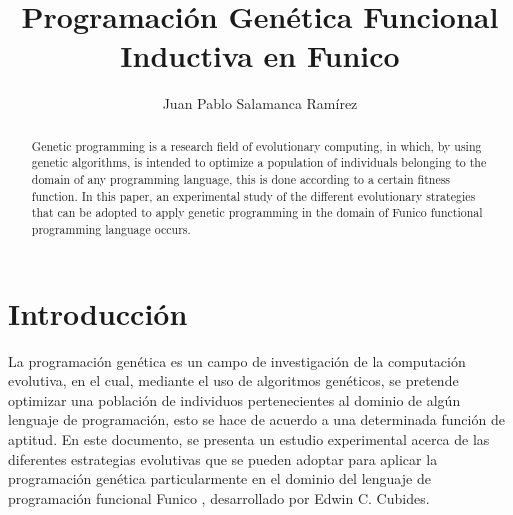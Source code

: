 \documentclass{llncs}
\begin{document}
\title{Programación Genética Funcional Inductiva en Funico}
%
%
\author{Juan Pablo Salamanca Ramírez}
%
%
\tocauthor{}
%

\maketitle

\begin{abstract}
Genetic programming is a research field of evolutionary computing, in which, by using genetic algorithms, is intended to optimize a population of individuals belonging to the domain of any programming language, this is done according to a certain fitness function.
In this paper, an experimental study of the different evolutionary strategies that can be adopted to apply genetic programming in the domain of Funico functional programming language occurs.
\end{abstract}
%



\section{Introducción}
La programación genética es un campo de investigación de la computación evolutiva, en el cual, mediante el uso de algoritmos genéticos, se pretende optimizar una población de individuos pertenecientes al dominio de algún lenguaje de programación, esto se hace de acuerdo a una determinada función de aptitud.
En este documento, se presenta un estudio experimental acerca de las diferentes estrategias evolutivas que se pueden adoptar para aplicar la programación genética particularmente en el dominio del lenguaje de programación funcional Funico \cite{cub:gom}, desarrollado por Edwin C. Cubides.

\end{document}
